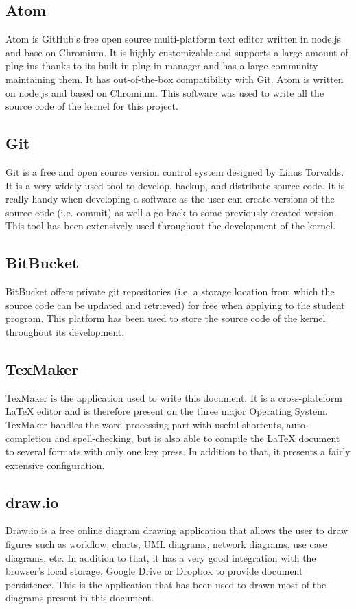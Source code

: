 \subsection{Atom}
Atom is GitHub's free open source multi-platform text editor written in node.js and base on Chromium. It is highly customizable and supports a large amount of plug-ins thanks to its built in plug-in manager and has a large  community maintaining them. It has out-of-the-box compatibility with Git. Atom is written on node.js and based on Chromium.
This software was used to write all the source code of the kernel for this project.

\subsection{Git}
Git is a free and open source version control system designed by Linus Torvalds. It is a very widely used tool to develop, backup, and distribute source code. It is really handy when developing a software as the user can create versions of the source code (i.e. commit) as well a go back to some previously created version. This tool has been extensively used throughout the development of the kernel.

\subsection{BitBucket}
BitBucket offers private git repositories (i.e. a storage location from which the source code can be updated and retrieved) for free when applying to the student program. This platform has been used to store the source code of the kernel throughout its development.


\subsection{TexMaker}
TexMaker is the application used to write this document. It is a cross-plateform LaTeX editor and is therefore present on the three major Operating System. TexMaker handles the word-processing part with useful shortcuts, auto-completion and spell-checking, but is also able to compile the LaTeX document to several formats with only one key press. In addition to that, it presents a fairly extensive configuration. 


\subsection{draw.io}
Draw.io is a free online diagram drawing application that allows the user to draw figures such as workflow, charts, UML diagrams, network diagrams, use case diagrams, etc. In addition to that, it has a very good integration with the browser's local storage, Google Drive or Dropbox to provide document persistence. This is the application that has been used to drawn most of the diagrams present in this document.